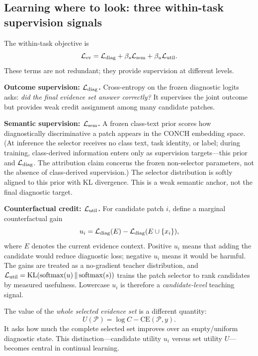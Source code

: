 \documentclass{article}
\def\L{{\cal L}}
\newcommand{\Psel}{\mathcal{P}}
\begin{document}
\subsection{Learning where to look: three within-task supervision signals}
\label{ssec:within}

The within-task objective is
\begin{equation}
\L_{\mathrm{ev}}
=
\L_{\mathrm{diag}}
+\beta_s\L_{\mathrm{sem}}
+\beta_u\L_{\mathrm{util}}.
\end{equation}
These terms are not redundant; they provide supervision at different levels.

\textbf{Outcome supervision: $\L_{\mathrm{diag}}$.}
Cross-entropy on the frozen diagnostic logits asks:
\emph{did the final evidence set answer correctly?}
It supervises the joint outcome but provides weak credit assignment among many candidate patches.

\textbf{Semantic supervision: $\L_{\mathrm{sem}}$.}
A frozen class-text prior scores how diagnostically discriminative a patch appears in the CONCH embedding space. (At inference the selector receives no class text, task identity, or label; during training, class-derived information enters only as supervision targets---this prior and $\L_{\rm diag}$. The attribution claim concerns the frozen non-selector parameters, not the absence of class-derived supervision.)
The selector distribution is softly aligned to this prior with KL divergence.
This is a weak semantic anchor, not the final diagnostic target.

\textbf{Counterfactual credit: $\L_{\mathrm{util}}$.}
For candidate patch $i$, define a marginal counterfactual gain
\begin{equation}
u_i
=
\L_{\mathrm{diag}}(E)
-
\L_{\mathrm{diag}}(E\cup\{x_i\}),
\label{eq:ui}
\end{equation}
where $E$ denotes the current evidence context.
Positive $u_i$ means that adding the candidate would reduce diagnostic loss; negative $u_i$ means it would be harmful.
The gains are treated as a no-gradient teacher distribution, and $\L_{\mathrm{util}}=\mathrm{KL}(\mathrm{softmax}(u)\,\Vert\,\mathrm{softmax}(s))$ trains the patch selector to rank candidates by measured usefulness.
Lowercase $u_i$ is therefore a \emph{candidate-level} teaching signal.

The value of the \emph{whole selected evidence set} is a different quantity:
\begin{equation}
U(\Psel)
=
\log C-\mathrm{CE}(\Psel,y).
\label{eq:bigU}
\end{equation}
It asks how much the complete selected set improves over an empty/uniform diagnostic state.
This distinction---candidate utility $u_i$ versus set utility $U$---becomes central in continual learning.
\end{document}
